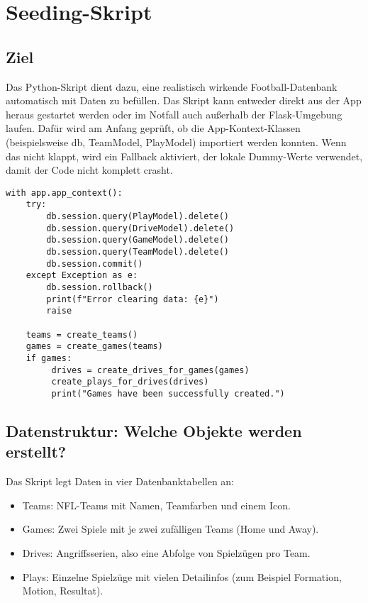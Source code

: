 \section{Seeding-Skript}

\subsection{Ziel}

Das Python-Skript dient dazu, eine realistisch wirkende Football-Datenbank automatisch mit Daten zu befüllen.
Das Skript kann entweder direkt aus der App heraus gestartet werden oder im Notfall auch außerhalb der Flask-Umgebung laufen. Dafür wird am Anfang geprüft, ob die App-Kontext-Klassen (beispielsweise db, TeamModel, PlayModel) importiert werden konnten. Wenn das nicht klappt, wird ein Fallback aktiviert, der lokale Dummy-Werte verwendet, damit der Code nicht komplett crasht.

\begin{verbatim}
with app.app_context():
    try:
        db.session.query(PlayModel).delete()
        db.session.query(DriveModel).delete()
        db.session.query(GameModel).delete()
        db.session.query(TeamModel).delete()
        db.session.commit()
    except Exception as e:
        db.session.rollback()
        print(f"Error clearing data: {e}")
        raise

    teams = create_teams()
    games = create_games(teams)
    if games:
         drives = create_drives_for_games(games)
         create_plays_for_drives(drives)
         print("Games have been successfully created.")
\end{verbatim}

\subsection{Datenstruktur: Welche Objekte werden erstellt?}

Das Skript legt Daten in vier Datenbanktabellen an:
\begin{itemize}
  \item Teams: NFL-Teams mit Namen, Teamfarben und einem Icon.
  \item Games: Zwei Spiele mit je zwei zufälligen Teams (Home und Away).
  \item Drives: Angriffsserien, also eine Abfolge von Spielzügen pro Team.
  \item Plays: Einzelne Spielzüge mit vielen Detailinfos (zum Beispiel Formation, Motion, Resultat).
\end{itemize}

